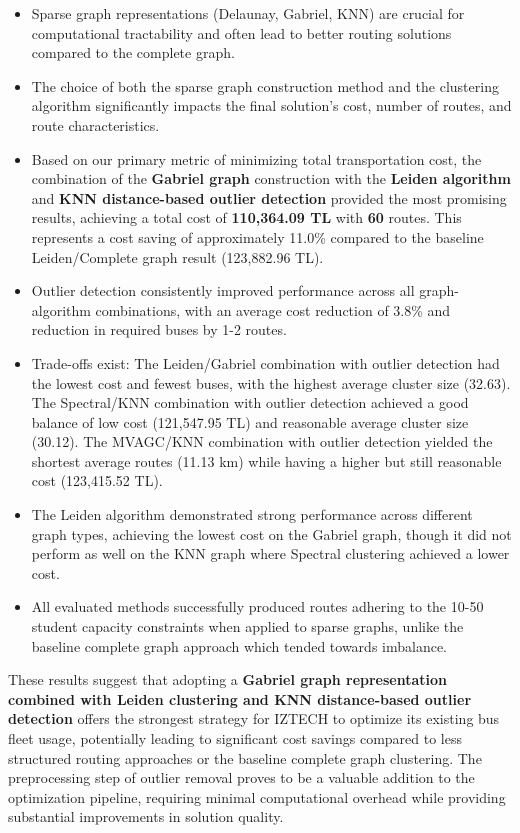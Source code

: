 \begin{itemize}
    \item Sparse graph representations (Delaunay, Gabriel, KNN) are crucial for computational tractability and often lead to better routing solutions compared to the complete graph.
    \item The choice of both the sparse graph construction method and the clustering algorithm significantly impacts the final solution's cost, number of routes, and route characteristics.
    \item Based on our primary metric of minimizing total transportation cost, the combination of the \textbf{Gabriel graph} construction with the \textbf{Leiden algorithm} and \textbf{KNN distance-based outlier detection} provided the most promising results, achieving a total cost of \textbf{110,364.09 TL} with \textbf{60} routes. This represents a cost saving of approximately 11.0\% compared to the baseline Leiden/Complete graph result (123,882.96 TL).
    \item Outlier detection consistently improved performance across all graph-algorithm combinations, with an average cost reduction of 3.8\% and reduction in required buses by 1-2 routes.
    \item Trade-offs exist: The Leiden/Gabriel combination with outlier detection had the lowest cost and fewest buses, with the highest average cluster size (32.63). The Spectral/KNN combination with outlier detection achieved a good balance of low cost (121,547.95 TL) and reasonable average cluster size (30.12). The MVAGC/KNN combination with outlier detection yielded the shortest average routes (11.13 km) while having a higher but still reasonable cost (123,415.52 TL).
    \item The Leiden algorithm demonstrated strong performance across different graph types, achieving the lowest cost on the Gabriel graph, though it did not perform as well on the KNN graph where Spectral clustering achieved a lower cost.
    \item All evaluated methods successfully produced routes adhering to the 10-50 student capacity constraints when applied to sparse graphs, unlike the baseline complete graph approach which tended towards imbalance.
\end{itemize}

These results suggest that adopting a \textbf{Gabriel graph representation combined with Leiden clustering and KNN distance-based outlier detection} offers the strongest strategy for IZTECH to optimize its existing bus fleet usage, potentially leading to significant cost savings compared to less structured routing approaches or the baseline complete graph clustering. The preprocessing step of outlier removal proves to be a valuable addition to the optimization pipeline, requiring minimal computational overhead while providing substantial improvements in solution quality.

